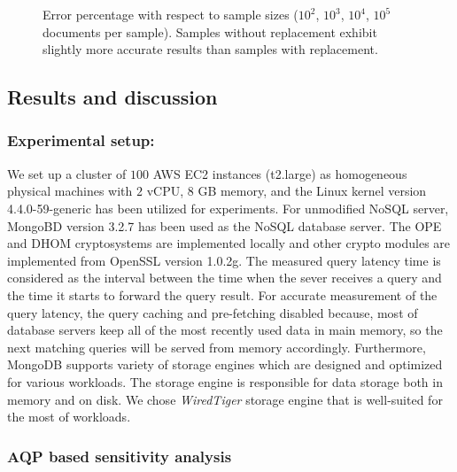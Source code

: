 \begin{figure}[H]
\centering
\resizebox{0.5\textwidth}{!}{}
\caption{Error percentage with respect to sample sizes ($10^2$, $10^3$, $10^4$, $10^5$ documents per sample). Samples without replacement exhibit slightly more accurate results than samples with replacement.}
\label{errorPercentageFigure}
\end{figure}

\subsection{Results and discussion}
\label{ResultAndDiscussionSubSection}
\subsubsection{Experimental setup:}
\label{subsec:ExperimentalSetup}
We set up a cluster of $100$ AWS EC2 instances (t2.large) as homogeneous physical machines with $2$ vCPU, $8$ GB memory, and the Linux kernel version 4.4.0-59-generic has been utilized for experiments. For unmodified NoSQL server, MongoBD version 3.2.7 has been used as the NoSQL database server. The OPE and DHOM cryptosystems are implemented locally and other crypto modules are implemented from OpenSSL version 1.0.2g. The measured query latency time is considered as the interval between the time when the sever receives a query and the time it starts to forward the query result. For accurate measurement of the query latency, the query caching and pre-fetching disabled because, most of database servers keep all of the most recently used data in main memory, so the next matching queries will be served from memory accordingly. Furthermore, MongoDB supports variety of storage engines which are designed and optimized for various workloads. The storage engine is responsible for data storage both in memory and on disk. We chose \emph{WiredTiger} storage engine that is well-suited for the most of workloads.


\subsubsection{AQP based sensitivity analysis}
\label{AQPSensitivityAnalysisSubSection}

